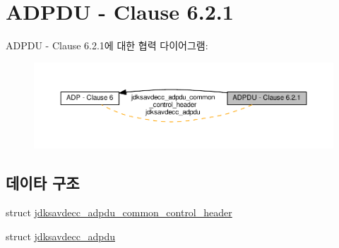 \hypertarget{group__adpdu}{}\section{A\+D\+P\+DU -\/ Clause 6.2.1}
\label{group__adpdu}
A\+D\+P\+DU -\/ Clause 6.2.1에 대한 협력 다이어그램\+:
\nopagebreak
\begin{figure}[H]
\begin{center}
\leavevmode
\includegraphics[width=350pt]{group__adpdu}
\end{center}
\end{figure}
\subsection*{데이타 구조}
\begin{DoxyCompactItemize}
\item 
struct \hyperlink{structjdksavdecc__adpdu__common__control__header}{jdksavdecc\+\_\+adpdu\+\_\+common\+\_\+control\+\_\+header}
\item 
struct \hyperlink{structjdksavdecc__adpdu}{jdksavdecc\+\_\+adpdu}
\end{DoxyCompactItemize}
